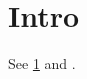 \documentclass[cleveref]{lipics-v2021}
\begin{document}
\section{Intro}\label{sec:intro}
See \cref{sec:intro} and .
\end{document}
